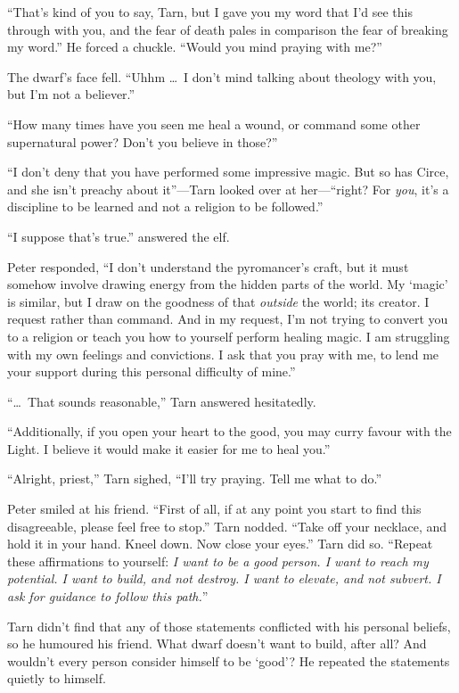 ``That's kind of you to say, Tarn, but I gave you my word that I'd see this through with you, and the fear of death pales in comparison the fear of breaking my word.''  He forced a chuckle.  ``Would you mind praying with me?''

The dwarf's face fell.  ``Uhhm \ldots\ I don't mind talking about theology with you, but I'm not a believer.''

``How many times have you seen me heal a wound, or command some other supernatural power?  Don't you believe in those?''

``I don't deny that you have performed some impressive magic.  But so has Circe, and she isn't preachy about it''---Tarn looked over at her---``right?  For \emph{you}, it's a discipline to be learned and not a religion to be followed.''

``I suppose that's true.'' answered the elf.

Peter responded, ``I don't understand the pyromancer's craft, but it must somehow involve drawing energy from the hidden parts of the world.  My `magic' is similar, but I draw on the goodness of that \emph{outside} the world; its creator.  I request rather than command.  And in my request, I'm not trying to convert you to a religion or teach you how to yourself perform healing magic.  I am struggling with my own feelings and convictions. I ask that you pray with me, to lend me your support during this personal difficulty of mine.''

``\ldots\ That sounds reasonable,'' Tarn answered hesitatedly.

``Additionally, if you open your heart to the good, you may curry favour with the Light.  I believe it would make it easier for me to heal you.''

``Alright, priest,'' Tarn sighed, ``I'll try praying.  Tell me what to do.''

Peter smiled at his friend.  ``First of all, if at any point you start to find this disagreeable, please feel free to stop.''  Tarn nodded.  ``Take off your necklace, and hold it in your hand.  Kneel down.  Now close your eyes.''  Tarn did so.  ``Repeat these affirmations to yourself: \emph{I want to be a good person.  I want to reach my potential.  I want to build, and not destroy.  I want to elevate, and not subvert.  I ask for guidance to follow this path.}''

Tarn didn't find that any of those statements conflicted with his personal beliefs, so he humoured his friend.  What dwarf doesn't want to build, after all?  And wouldn't every person consider himself to be `good'?  He repeated the statements quietly to himself.

